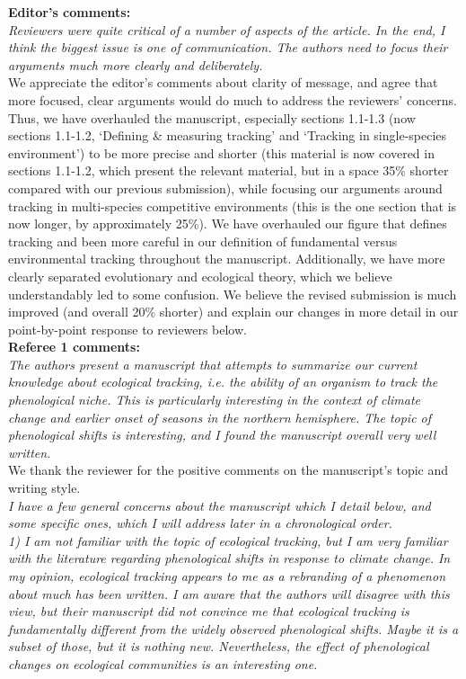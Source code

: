 \documentclass[11pt,letterpaper]{article}
\begin{document}
{\bf Editor's comments:} \\

\emph{Reviewers were quite critical of a number of aspects of the article.  In the end, I think the
biggest issue is one of communication. The authors need to focus their arguments much more
clearly and deliberately.}\\

We appreciate the editor's comments about clarity of message, and agree that more focused, clear arguments would do much to address the reviewers' concerns. Thus, we have overhauled the manuscript, especially sections 1.1-1.3 (now sections 1.1-1.2, `Defining \& measuring tracking' and `Tracking in single-species environment') to be more precise and shorter (this material is now covered in sections 1.1-1.2, which present the relevant material, but in a space 35\% shorter compared with our previous submission), while focusing our arguments around tracking in multi-species competitive environments (this is the one section that is now longer, by approximately 25\%). We have overhauled our figure that defines tracking and been more careful in our definition of fundamental versus environmental tracking throughout the manuscript. Additionally, we have more clearly separated evolutionary and ecological theory, which we believe understandably led to some confusion. We believe the revised submission is much improved (and overall 20\% shorter) and explain our changes in more detail in our point-by-point response to reviewers below.\\

{\bf Referee 1 comments:} \\

\emph{The authors present a manuscript that attempts to summarize our current knowledge about
ecological tracking, i.e. the ability of an organism to track the phenological niche. This is
particularly interesting in the context of climate change and earlier onset of seasons in the
northern hemisphere. The topic of phenological shifts is interesting, and I found the
manuscript overall very well written.}\\

We thank the reviewer for the positive comments on the manuscript's topic and writing style. \\

\emph{I have a few general concerns about the manuscript which I detail below, and some specific
ones, which I will address later in a chronological order.\\
1) I am not familiar with the topic of ecological tracking, but I am very familiar with the
literature regarding phenological shifts in response to climate change. In my opinion,
ecological tracking appears to me as a rebranding of a phenomenon about much has been
written. I am aware that the authors will disagree with this view, but their manuscript did
not convince me that ecological tracking is fundamentally different from the widely observed
phenological shifts. Maybe it is a subset of those, but it is nothing new. Nevertheless, the
effect of phenological changes on ecological communities is an interesting one.
}\\
\end{document}
